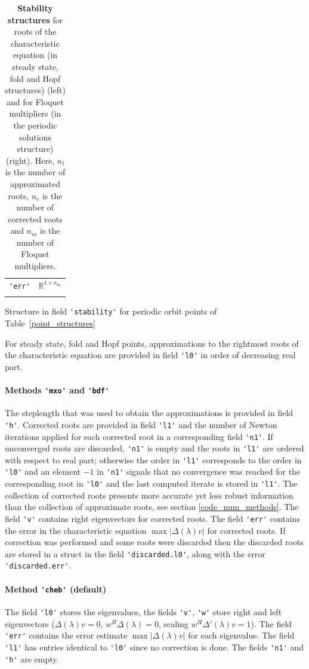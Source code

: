 \documentclass[10pt]{scrartcl}
\newcommand{\RR}{\mathbb{R}}
\newcommand{\blist}[1]{\mbox{\lstinline!#1!}}
\begin{document}
\begin{table}[htbp]
\begin{center}
\begin{subtable}[t]{0.35\textwidth}
\begin{tabular}[t]{lc}
        \blist{'err'} & $\RR^{1\times n_m}$\\ \\\hline
      \end{tabular}
      \caption{Structure in field \blist{'stability'} for periodic
        orbit points of Table~\ref{point_structures}}
    \end{subtable}
  \end{center}
  \caption{\label{stab_structures}
    \textbf{\textsf{Stability structures}} for roots of the characteristic equation
    (in steady state, fold and Hopf structures) (left)
    and for Floquet multipliers (in the periodic solutions structure) (right). 
    Here, $n_l$ is the number of approximated roots,
    $n_c$ is the number of corrected roots and $n_m$ is the number
    of Floquet multipliers.}
\end{table}
For steady state, fold and Hopf points, approximations to the
rightmost roots of the characteristic equation are provided in field
\blist{'l0'} in order of decreasing real part.

\paragraph{Methods \blist{'mxo'} and \blist{'bdf'}}
The steplength that was used to obtain the approximations is provided
in field \blist{'h'}. Corrected roots are provided in field
\blist{'l1'} and the number of Newton iterations applied for each
corrected root in a corresponding field \blist{'n1'}.  If unconverged
roots are discarded, \blist{'n1'} is empty and the roots in
\blist{'l1'} are ordered with respect to real part; otherwise the
order in \blist{'l1'} corresponds to the order in \blist{'l0'} and an
element $-1$ in \blist{'n1'} signals that no convergence was reached
for the corresponding root in \blist{'l0'} and the last computed
iterate is stored in \blist{'l1'}.  The collection of corrected roots
presents more accurate yet less robust information than the collection
of approximate roots, see section \ref{code_num_methods}. The field
\blist{'v'} contains right eigenvectors for corrected roots. The field
\blist{'err'} contains the error in the characteristic equation
$\max|\Delta(\lambda)v|$ for corrected roots. If correction was performed
and some roots were discarded then the discarded roots are stored in a
struct in the field \blist{'discarded.l0'}, along with the error \blist{'discarded.err'}.

\paragraph{Method \blist{'cheb'} (default)}
The field \blist{'l0'} stores the eigenvalues, the fields \blist{'v'},
\blist{'w'} store right and left eigenvectors ($\Delta(\lambda)v=0$,
$w^H\Delta(\lambda)=0$, scaling $w^H\Delta'(\lambda)v=1$). The field
\blist{'err'} contains the error estimate $\max|\Delta(\lambda)v|$ for
each eigenvalue. The field \blist{'l1'} has entries identical to
\blist{'l0'} since no correction is done. The fields \blist{'n1'} and
\blist{'h'} are empty.
\end{document}
